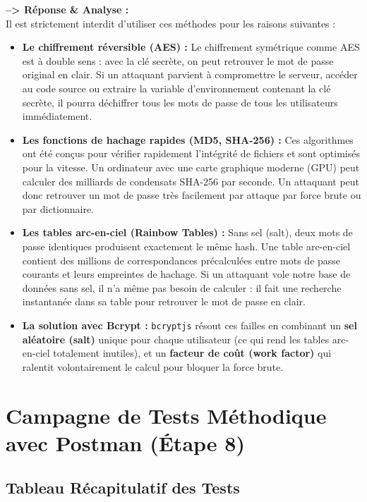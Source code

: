 \documentclass[12pt,a4paper]{article}
\begin{document}
\textbf{--> Réponse \& Analyse :} \\
Il est strictement interdit d'utiliser ces méthodes pour les raisons suivantes :
\begin{itemize}
    \item \textbf{Le chiffrement réversible (AES) :} Le chiffrement symétrique comme AES est à double sens : avec la clé secrète, on peut retrouver le mot de passe original en clair. Si un attaquant parvient à compromettre le serveur, accéder au code source ou extraire la variable d'environnement contenant la clé secrète, il pourra déchiffrer tous les mots de passe de tous les utilisateurs immédiatement.
    \item \textbf{Les fonctions de hachage rapides (MD5, SHA-256) :} Ces algorithmes ont été conçus pour vérifier rapidement l'intégrité de fichiers et sont optimisés pour la vitesse. Un ordinateur avec une carte graphique moderne (GPU) peut calculer des milliards de condensats SHA-256 par seconde. Un attaquant peut donc retrouver un mot de passe très facilement par attaque par force brute ou par dictionnaire.
    \item \textbf{Les tables arc-en-ciel (Rainbow Tables) :} Sans sel (salt), deux mots de passe identiques produisent exactement le même hash. Une table arc-en-ciel contient des millions de correspondances précalculées entre mots de passe courants et leurs empreintes de hachage. Si un attaquant vole notre base de données sans sel, il n'a même pas besoin de calculer : il fait une recherche instantanée dans sa table pour retrouver le mot de passe en clair.
    \item \textbf{La solution avec Bcrypt :} \texttt{bcryptjs} résout ces failles en combinant un \textbf{sel aléatoire (salt)} unique pour chaque utilisateur (ce qui rend les tables arc-en-ciel totalement inutiles), et un \textbf{facteur de coût (work factor)} qui ralentit volontairement le calcul pour bloquer la force brute.
\end{itemize}

\clearpage

\section{Campagne de Tests Méthodique avec Postman (Étape 8)}

\subsection{Tableau Récapitulatif des Tests}
\end{document}

